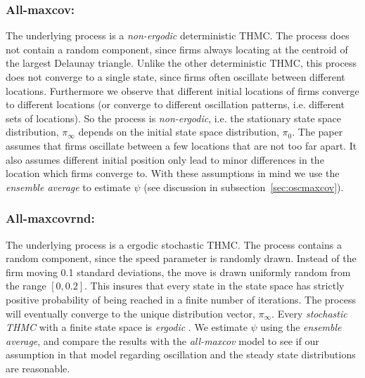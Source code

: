 \documentclass[preprint, 12pt]{elsarticle}
\begin{document}
\subsubsection*{All-maxcov:}
The underlying process is a \emph{non-ergodic} deterministic THMC. The process does not contain a random component, since firms always locating at the centroid of the largest Delaunay triangle. Unlike the other deterministic THMC, this process does not converge to a single state, since firms often oscillate between different locations. Furthermore we observe that different initial locations of firms converge to different locations (or converge to different oscillation patterns, i.e. different sets of locations). So the process is \emph{non-ergodic}, i.e. the stationary state space distribution, $\pi_\infty$ depends on the initial state space distribution, $\pi_0$. The paper assumes that firms oscillate between a few locations that are not too far apart. It also assumes different initial position only lead to minor differences in the location which firms converge to. With these assumptions in mind we use the \emph{ensemble average} to estimate $\psi$ (see discussion in subsection~\ref{sec:oscmaxcov}).

\subsubsection*{All-maxcovrnd:}
The underlying process is a ergodic stochastic THMC. The process contains a random component, since the speed parameter is randomly drawn. Instead of the firm moving 0.1 standard deviations, the move is drawn uniformly random from the range $[0, 0.2]$. This insures that every state in the state space has strictly positive probability of being reached in a finite number of iterations. The process will eventually converge to the unique distribution vector, $\pi_\infty$. Every \emph{stochastic THMC} with a finite state space is \emph{ergodic} \citep[chapter~4, p.~64]{Laver_Sergenti_2011}. We estimate $\psi$ using the \emph{ensemble average}, and compare the results with the \emph{all-maxcov} model to see if our assumption in that model regarding oscillation and the steady state distributions are reasonable.
\end{document}
